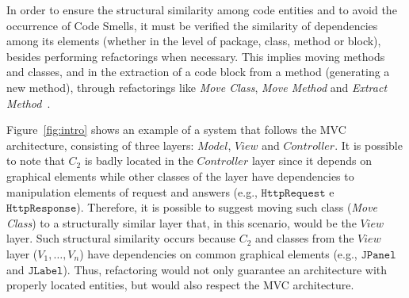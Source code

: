 \documentclass[smallextended,natbib]{svjour3}
\newcommand{\mcode}[1]{{$\mathtt{#1}$}}
\begin{document}


In order to ensure the structural similarity among code entities and to avoid the occurrence of Code Smells, it must be verified the similarity of dependencies among its elements (whether in the level of package, class, method or block), besides performing refactorings when necessary. This implies moving methods and classes, and in the extraction of a code block from a method (generating a new method), through refactorings like \textit{Move Class}, \textit{Move Method} and \textit{Extract Method}~\citep{fowler1999refactoring}.

Figure~\ref{fig:intro} shows an example of a system that follows the MVC architecture, consisting of three layers: $Model$, $View$ and $Controller$. It is possible to note that $C_2$ is badly located in the $Controller$ layer since it depends on graphical elements while other classes of the layer have dependencies to manipulation elements of request and answers (e.g., \mcode{HttpRequest} e \mcode{HttpResponse}). Therefore, it is possible to suggest moving such class (\textit{Move Class}) to a structurally similar layer that, in this scenario, would be the $View$ layer. Such structural similarity occurs because $C_2$ and classes from the $View$ layer ($V_1, \dots, V_n$) have dependencies on common graphical elements (e.g., \mcode{JPanel} and \mcode{JLabel}). Thus, refactoring would not only guarantee an architecture with properly located entities, but would also respect the MVC architecture.
\end{document}
